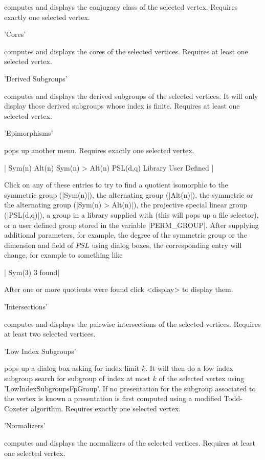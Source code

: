 computes and  displays  the   conjugacy  class of  the   selected vertex.
Requires  exactly  one selected vertex.  

'Cores'

computes and  displays the cores  of the selected vertices.   Requires at
least one selected vertex.


'Derived Subgroups'

computes and displays the derived subgroups of the selected vertices.  It
will  only  display  those derived    subgroups  whose index is   finite.
Requires at least one selected vertex.

'Epimorphisms'

pops up another menu. Requires exactly one selected vertex.

|    Sym(n)
    Alt(n)
    Sym(n) > Alt(n)
    PSL(d,q)
    Library
    User Defined |

Click on any of these entries to try to find a quotient isomorphic to the
symmetric  group (|Sym(n)|), the     alternating group  (|Alt(n)|),   the
symmetric or the alternating   group (|Sym(n) > Alt(n)|),  the projective
special  linear group  (|PSL(d,q)|), a group  in a  library supplied with
{\XGAP} (this will   pops up a file   selector), or a user defined  group
stored   in   the  variable  |PERM_GROUP|.   After  supplying  additional
parameters,  for  example, the  degree of   the   symmetric group  or the
dimension and field of $PSL$  using dialog boxes, the corresponding entry
will change, for example to something like

|    Sym(3)        3 found|

After one or more quotients were found click <display> to display them.

'Intersections'

computes and   displays   the pairwise   intersections  of  the  selected
vertices.  Requires at least two selected vertices.

'Low Index Subgroups'

pops up a dialog box asking for index  limit $k$.  It  will then do a low
index subgroup search for  subgroup of index at  most $k$ of the selected
vertex using 'LowIndexSubgroupsFpGroup'.    If no  presentation  for  the
subgroup   associated to  the vertex  is  known a  presentation  is first
computed using a  modified  Todd-Coxeter algorithm. Requires  exactly one
selected vertex.

'Normalizers'

computes and displays the normalizers of the selected vertices.  Requires
at least one selected vertex.

